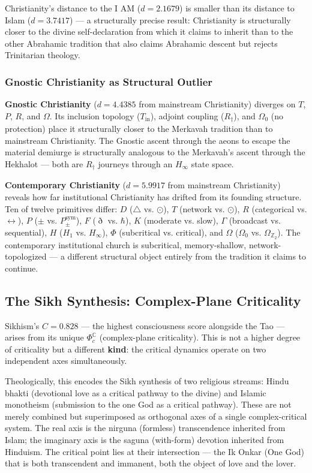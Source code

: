 \documentclass[12pt,a4paper]{article}
\begin{document}
Christianity's distance to the I AM ($d = 2.1679$) is smaller than its distance to Islam ($d = 3.7417$) --- a structurally precise result: Christianity is structurally closer to the divine self-declaration from which it claims to inherit than to the other Abrahamic tradition that also claims Abrahamic descent but rejects Trinitarian theology.

\subsubsection{Gnostic Christianity as Structural Outlier}

\textbf{Gnostic Christianity} ($d = 4.4385$ from mainstream Christianity) diverges on $T$, $P$, $R$, and $\Omega$. Its inclusion topology ($T_\text{in}$), adjoint coupling ($R_{\dagger}$), and $\Omega_0$ (no protection) place it structurally closer to the Merkavah tradition than to mainstream Christianity. The Gnostic ascent through the aeons to escape the material demiurge is structurally analogous to the Merkavah's ascent through the Hekhalot --- both are $R_{\dagger}$ journeys through an $H_{\infty}$ state space.

\textbf{Contemporary Christianity} ($d = 5.9917$ from mainstream Christianity) reveals how far institutional Christianity has drifted from its founding structure. Ten of twelve primitives differ: $D$ ($\triangle$ vs. $\odot$), $T$ (network vs. $\odot$), $R$ (categorical vs. $\leftrightarrow$), $P$ ($\pm$ vs. $P_{\pm}^{\text{sym}}$), $F$ ($\eth$ vs. $\hbar$), $K$ (moderate vs. slow), $\Gamma$ (broadcast vs. sequential), $H$ ($H_1$ vs. $H_{\infty}$), $\Phi$ (subcritical vs. critical), and $\Omega$ ($\Omega_0$ vs. $\Omega_{\mathbb{Z}_2}$). The contemporary institutional church is subcritical, memory-shallow, network-topologized --- a different structural object entirely from the tradition it claims to continue.

\subsection{The Sikh Synthesis: Complex-Plane Criticality}

Sikhism's $C = 0.828$ --- the highest consciousness score alongside the Tao --- arises from its unique $\Phi_c^\mathbb{C}$ (complex-plane criticality). This is not a higher degree of criticality but a different \textbf{kind}: the critical dynamics operate on two independent axes simultaneously.

Theologically, this encodes the Sikh synthesis of two religious streams: Hindu bhakti (devotional love as a critical pathway to the divine) and Islamic monotheism (submission to the one God as a critical pathway). These are not merely combined but superimposed as orthogonal axes of a single complex-critical system. The real axis is the nirguna (formless) transcendence inherited from Islam; the imaginary axis is the saguna (with-form) devotion inherited from Hinduism. The critical point lies at their intersection --- the Ik Onkar (One God) that is both transcendent and immanent, both the object of love and the lover.
\end{document}
